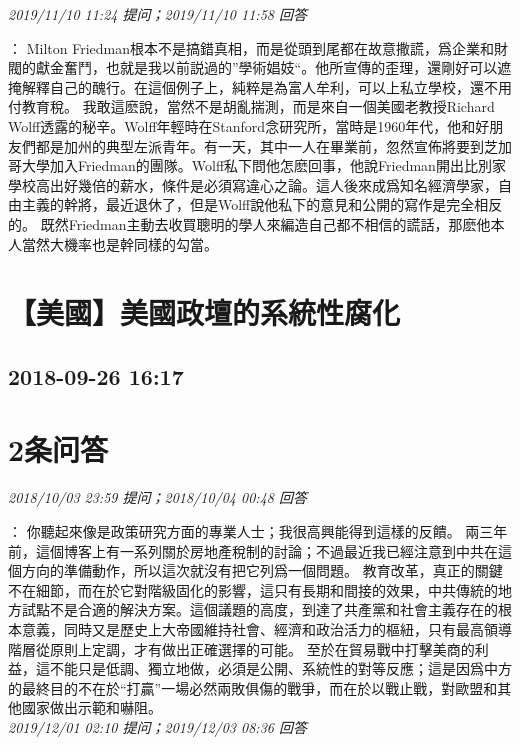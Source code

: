 \documentclass[twocolumn]{ctexart}
\begin{document}
\textit{\hfill\noindent\small 2019/11/10 11:24 提问；2019/11/10 11:58 回答}

：
Milton Friedman根本不是搞錯真相，而是從頭到尾都在故意撒謊，爲企業和財閥的獻金奮鬥，也就是我以前説過的”學術娼妓“。他所宣傳的歪理，還剛好可以遮掩解釋自己的醜行。在這個例子上，純粹是為富人牟利，可以上私立學校，還不用付教育稅。 
我敢這麽說，當然不是胡亂揣測，而是來自一個美國老教授Richard Wolff透露的秘辛。Wolff年輕時在Stanford念研究所，當時是1960年代，他和好朋友們都是加州的典型左派青年。有一天，其中一人在畢業前，忽然宣佈將要到芝加哥大學加入Friedman的團隊。Wolff私下問他怎麽回事，他說Friedman開出比別家學校高出好幾倍的薪水，條件是必須寫違心之論。這人後來成爲知名經濟學家，自由主義的幹將，最近退休了，但是Wolff說他私下的意見和公開的寫作是完全相反的。 
既然Friedman主動去收買聰明的學人來編造自己都不相信的謊話，那麽他本人當然大機率也是幹同樣的勾當。
\\


\section{【美國】美國政壇的系統性腐化}
\subsection{2018-09-26 16:17}


\section{2条问答}

\textit{\hfill\noindent\small 2018/10/03 23:59 提问；2018/10/04 00:48 回答}

：
你聽起來像是政策研究方面的專業人士；我很高興能得到這樣的反饋。
兩三年前，這個博客上有一系列關於房地產稅制的討論；不過最近我已經注意到中共在這個方向的準備動作，所以這次就沒有把它列爲一個問題。
教育改革，真正的關鍵不在細節，而在於它對階級固化的影響，這只有長期和間接的效果，中共傳統的地方試點不是合適的解決方案。這個議題的高度，到達了共產黨和社會主義存在的根本意義，同時又是歷史上大帝國維持社會、經濟和政治活力的樞紐，只有最高領導階層從原則上定調，才有做出正確選擇的可能。
至於在貿易戰中打擊美商的利益，這不能只是低調、獨立地做，必須是公開、系統性的對等反應；這是因爲中方的最終目的不在於“打贏”一場必然兩敗俱傷的戰爭，而在於以戰止戰，對歐盟和其他國家做出示範和嚇阻。
\\

\textit{\hfill\noindent\small 2019/12/01 02:10 提问；2019/12/03 08:36 回答}
\end{document}
